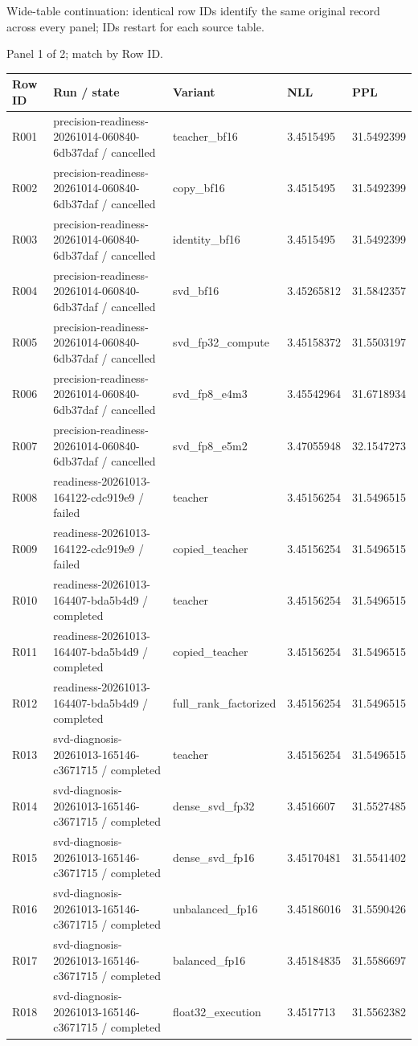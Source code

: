 \documentclass[10pt]{article}
\begin{document}
Wide-table continuation: identical row IDs identify the same original record across every panel; IDs restart for each source table.
\par\noindent Panel 1 of 2; match by Row ID.
{\scriptsize\setlength{\tabcolsep}{2pt}
\begin{longtable}{p{}p{}p{}p{}p{}}
Row ID & Run / state & Variant & NLL & PPL \\
\hline\endhead
R001 & precision-readiness-20261014-060840-6db37daf / cancelled & teacher\_bf16 & 3.4515495 & 31.5492399 \\
R002 & precision-readiness-20261014-060840-6db37daf / cancelled & copy\_bf16 & 3.4515495 & 31.5492399 \\
R003 & precision-readiness-20261014-060840-6db37daf / cancelled & identity\_bf16 & 3.4515495 & 31.5492399 \\
R004 & precision-readiness-20261014-060840-6db37daf / cancelled & svd\_bf16 & 3.45265812 & 31.5842357 \\
R005 & precision-readiness-20261014-060840-6db37daf / cancelled & svd\_fp32\_compute & 3.45158372 & 31.5503197 \\
R006 & precision-readiness-20261014-060840-6db37daf / cancelled & svd\_fp8\_e4m3 & 3.45542964 & 31.6718934 \\
R007 & precision-readiness-20261014-060840-6db37daf / cancelled & svd\_fp8\_e5m2 & 3.47055948 & 32.1547273 \\
R008 & readiness-20261013-164122-cdc919e9 / failed & teacher & 3.45156254 & 31.5496515 \\
R009 & readiness-20261013-164122-cdc919e9 / failed & copied\_teacher & 3.45156254 & 31.5496515 \\
R010 & readiness-20261013-164407-bda5b4d9 / completed & teacher & 3.45156254 & 31.5496515 \\
R011 & readiness-20261013-164407-bda5b4d9 / completed & copied\_teacher & 3.45156254 & 31.5496515 \\
R012 & readiness-20261013-164407-bda5b4d9 / completed & full\_rank\_factorized & 3.45156254 & 31.5496515 \\
R013 & svd-diagnosis-20261013-165146-c3671715 / completed & teacher & 3.45156254 & 31.5496515 \\
R014 & svd-diagnosis-20261013-165146-c3671715 / completed & dense\_svd\_fp32 & 3.4516607 & 31.5527485 \\
R015 & svd-diagnosis-20261013-165146-c3671715 / completed & dense\_svd\_fp16 & 3.45170481 & 31.5541402 \\
R016 & svd-diagnosis-20261013-165146-c3671715 / completed & unbalanced\_fp16 & 3.45186016 & 31.5590426 \\
R017 & svd-diagnosis-20261013-165146-c3671715 / completed & balanced\_fp16 & 3.45184835 & 31.5586697 \\
R018 & svd-diagnosis-20261013-165146-c3671715 / completed & float32\_execution & 3.4517713 & 31.5562382 \\
\end{longtable}}
\end{document}
